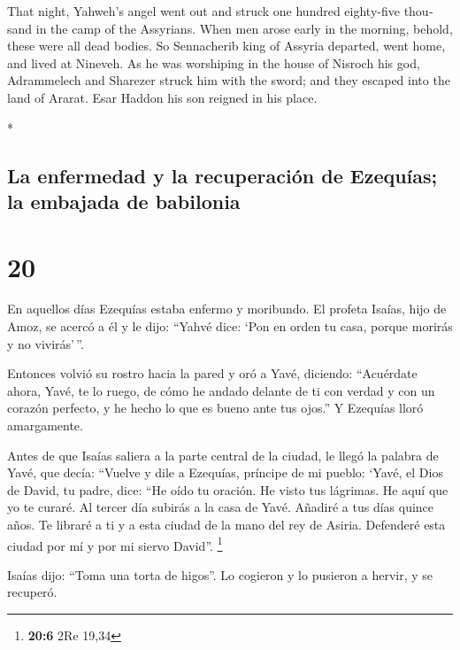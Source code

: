 \begin{paracol}{2}
\begin{otherlanguage}{english}
 That night, Yahweh's angel went out and struck one
hundred eighty-five thousand in the camp of the Assyrians. When men
arose early in the morning, behold, these were all dead bodies.
 So Sennacherib king of Assyria departed, went home, and
lived at Nineveh.  As he was worshiping in the house of
Nisroch his god, Adrammelech and Sharezer struck him with the sword; and
they escaped into the land of Ararat. Esar Haddon his son reigned in his
place.

\end{otherlanguage}

\switchcolumn[0]*

\hypertarget{la-enfermedad-y-la-recuperaciuxf3n-de-ezequuxedas-la-embajada-de-babilonia}{%
\subsection{La enfermedad y la recuperación de Ezequías; la embajada de
babilonia}\label{la-enfermedad-y-la-recuperaciuxf3n-de-ezequuxedas-la-embajada-de-babilonia}}

\hypertarget{section-38}{%
\section{20}\label{section-38}}

 En aquellos días Ezequías estaba enfermo y moribundo. El
profeta Isaías, hijo de Amoz, se acercó a él y le dijo: ``Yahvé dice:
`Pon en orden tu casa, porque morirás y no vivirás'\,''.

 Entonces volvió su rostro hacia la pared y oró a Yavé,
diciendo:  ``Acuérdate ahora, Yavé, te lo ruego, de cómo
he andado delante de ti con verdad y con un corazón perfecto, y he hecho
lo que es bueno ante tus ojos.'' Y Ezequías lloró amargamente.

 Antes de que Isaías saliera a la parte central de la
ciudad, le llegó la palabra de Yavé, que decía:  ``Vuelve
y dile a Ezequías, príncipe de mi pueblo: `Yavé, el Dios de David, tu
padre, dice: ``He oído tu oración. He visto tus lágrimas. He aquí que yo
te curaré. Al tercer día subirás a la casa de Yavé. 
Añadiré a tus días quince años. Te libraré a ti y a esta ciudad de la
mano del rey de Asiria. Defenderé esta ciudad por mí y por mi siervo
David''. \footnote{\textbf{20:6} 2Re 19,34}

 Isaías dijo: ``Toma una torta de higos''. Lo cogieron y
lo pusieron a hervir, y se recuperó.


\end{paracol}
